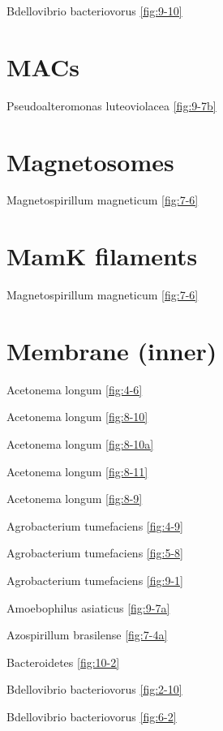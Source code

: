 \documentclass[]{tufte-book}
\begin{document}
Bdellovibrio bacteriovorus \ref{fig:9-10}

\hypertarget{macs}{%
\section*{MACs}\label{macs}}

Pseudoalteromonas luteoviolacea \ref{fig:9-7b}

\hypertarget{magnetosomes}{%
\section*{Magnetosomes}\label{magnetosomes}}

Magnetospirillum magneticum \ref{fig:7-6}

\hypertarget{mamk-filaments}{%
\section*{MamK filaments}\label{mamk-filaments}}

Magnetospirillum magneticum \ref{fig:7-6}

\hypertarget{membrane-inner}{%
\section*{Membrane (inner)}\label{membrane-inner}}

Acetonema longum \ref{fig:4-6}

Acetonema longum \ref{fig:8-10}

Acetonema longum \ref{fig:8-10a}

Acetonema longum \ref{fig:8-11}

Acetonema longum \ref{fig:8-9}

Agrobacterium tumefaciens \ref{fig:4-9}

Agrobacterium tumefaciens \ref{fig:5-8}

Agrobacterium tumefaciens \ref{fig:9-1}

Amoebophilus asiaticus \ref{fig:9-7a}

Azospirillum brasilense \ref{fig:7-4a}

Bacteroidetes \ref{fig:10-2}

Bdellovibrio bacteriovorus \ref{fig:2-10}

Bdellovibrio bacteriovorus \ref{fig:6-2}
\end{document}
